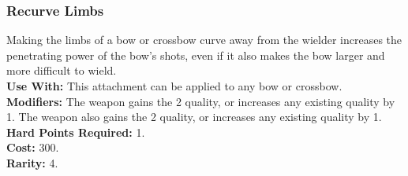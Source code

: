 \subsubsection{Recurve Limbs}
Making the limbs of a bow or crossbow curve away
from the wielder increases the penetrating power of
the bow's shots, even if it also makes the bow larger and
more difficult to wield.\\
\textbf{Use With:} This attachment can be applied to any bow
    or crossbow.\\
\textbf{Modifiers:} The weapon gains the  2 quality, or
    increases any existing  quality by 1. The weapon
    also gains the  2 quality, or increases any
    existing  quality by 1.\\
\textbf{Hard Points Required:} 1.\\
\textbf{Cost:} 300.\\
\textbf{Rarity:} 4.\\
